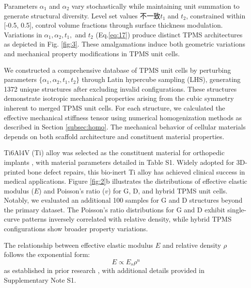 \documentclass[preprint,review,12pt,authoryear]{elsarticle}
\begin{document}
Parameters $\alpha_1$ and $\alpha_2$ vary stochastically while maintaining unit summation to generate structural diversity. Level set values  {不一致}{$t_1$ and $t_2$}, constrained within [-0.5, 0.5], control volume fractions through surface thickness modulation. Variations in $\alpha_1, \alpha_2, t_1,$ and $t_2$ (Eq.\ref{eq:17}) produce distinct TPMS architectures as depicted in Fig. \ref{fig:3}. These amalgamations induce both geometric variations and mechanical property modifications in TPMS unit cells.


We constructed a comprehensive database of TPMS unit cells by perturbing parameters $\{\alpha_1, \alpha_2, t_1, t_2\}$ through Latin hypercube sampling (LHS), generating 1372 unique structures after excluding invalid configurations. These structures demonstrate isotropic mechanical properties arising from the cubic symmetry inherent to merged TPMS unit cells. For each structure, we calculated the effective mechanical stiffness tensor using numerical homogenization methods as described in Section \ref{subsec:homo}. The mechanical behavior of cellular materials depends on both scaffold architecture and constituent material properties.

Ti6Al4V (Ti) alloy was selected as the constituent material for orthopedic implants \citep{Peng2023}, with material parameters detailed in Table S1. Widely adopted for 3D-printed bone defect repairs, this bio-inert Ti alloy has achieved clinical success in medical applications. Figure \ref{fig:2}b illustrates the distributions of effective elastic modulus ($E$) and Poisson's ratio ($v$) for G, D, and hybrid TPMS unit cells. Notably, we evaluated an additional 100 samples for G and D structures beyond the primary dataset. The Poisson's ratio distributions for G and D exhibit single-curve patterns inversely correlated with relative density, while hybrid TPMS configurations show broader property variations.

The relationship between effective elastic modulus $E$ and relative density $\rho$ follows the exponential form:
$$E \propto E_s\rho^{n}$$
as established in prior research \citep{Bauer2017}, with additional details provided in Supplementary Note S1.
\end{document}
